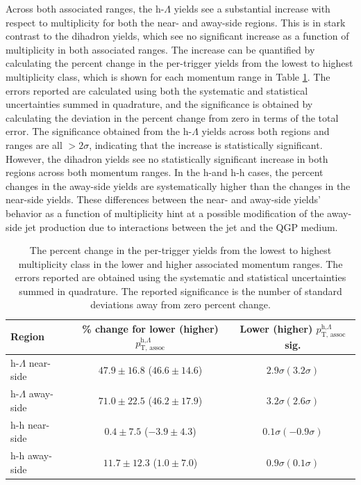Across both associated \pt ranges, the h-$\Lambda$ yields see a substantial increase with respect to multiplicity for both the near- and away-side regions. This is in stark contrast to the dihadron yields, which see no significant increase as a function of multiplicity in both associated \pt ranges.  The increase can be quantified by calculating the percent change in the per-trigger yields from the lowest to highest multiplicity class, which is shown for each momentum range in Table \ref{tab:percent_increase}. The errors reported are calculated using both the systematic and statistical uncertainties summed in quadrature, and the significance is obtained by calculating the deviation in the percent change from zero in terms of the total error. The significance obtained from the h-$\Lambda$ yields across both regions and \pt ranges are all $>2\sigma$, indicating that the increase is statistically significant. However, the dihadron yields see no statistically significant increase in both regions across both momentum ranges. In the h-\lmb and h-h cases, the percent changes in the away-side yields are systematically higher than the changes in the near-side yields. These differences between the near- and away-side yields' behavior as a function of multiplicity hint at a possible modification of the away-side jet production due to interactions between the jet and the QGP medium.

\begin{table}
\centering
\caption{The percent change in the per-trigger yields from the lowest to highest multiplicity class in the lower and higher associated momentum ranges. The errors reported are obtained using the systematic and statistical uncertainties summed in quadrature. The reported significance is the number of standard deviations away from zero percent change.}
\begin{tabular}{l c c}
\hline
Region & \% change for lower (higher) $p_{\text{T, assoc}}^{\text{h,}\Lambda}$ & Lower (higher) $p_{\text{T, assoc}}^{\text{h,}\Lambda}$ sig. \\
\hline
h-$\Lambda$ near-side &  $47.9 \pm 16.8$ ($46.6 \pm 14.6$) & $ 2.9\sigma (3.2\sigma) $\\ 
h-$\Lambda$ away-side &  $71.0 \pm 22.5$ ($46.2 \pm 17.9$) & $3.2\sigma (2.6\sigma)$ \\
h-h near-side &  $ 0.4 \pm 7.5$ ($-3.9 \pm 4.3$) & $0.1\sigma (-0.9\sigma)$ \\
h-h away-side &  $11.7 \pm 12.3$ ($1.0 \pm 7.0$) & $0.9\sigma (0.1\sigma)$ \\
\hline
\end{tabular}
\label{tab:percent_increase}
\end{table}

